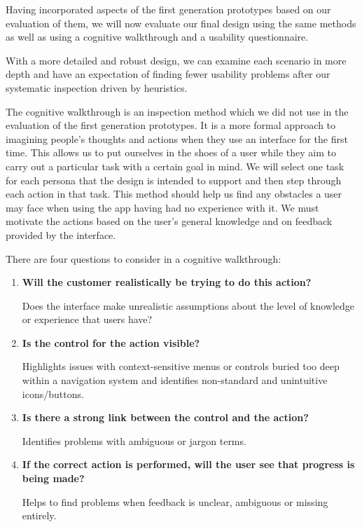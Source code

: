 Having incorporated aspects of the first generation prototypes based on our
evaluation of them, we will now evaluate our final design using the same
methods as well as using a cognitive walkthrough and a usability questionnaire.

With a more detailed and robust design, we can examine each scenario in more
depth and have an expectation of finding fewer usability problems after our
systematic inspection driven by heuristics.

The cognitive walkthrough is an inspection method which we did not use in the
evaluation of the first generation prototypes. It is a more formal approach to
imagining people's thoughts and actions when they use an interface for the
first time. This allows us to put ourselves in the shoes of a user while they
aim to carry out a particular task with a certain goal in mind. We will select
one task for each persona that the design is intended to support and then step
through each action in that task. This method should help us find any obstacles
a user may face when using the app having had no experience with it. We must
motivate the actions based on the user's general knowledge and on feedback
provided by the interface.

There are four questions to consider in a cognitive walkthrough\cite{cogwalk}:
\begin{enumerate}
	\item \textbf{Will the customer realistically be trying to do this action?}

	Does the interface make unrealistic assumptions about the level of
	knowledge or experience that users have?

	\item \textbf{Is the control for the action visible?}

	Highlights issues with context-sensitive menus or controls buried too deep
	within a navigation system and identifies non-standard and unintuitive
	icons/buttons.

	\item \textbf{Is there a strong link between the control and the action?}

	Identifies problems with ambiguous or jargon terms.

	\item \textbf{If the correct  action is performed, will the user see that
		progress is being made?}

	Helps to find problems when feedback is unclear, ambiguous or missing
	entirely.

\end{enumerate}
\bigskip

